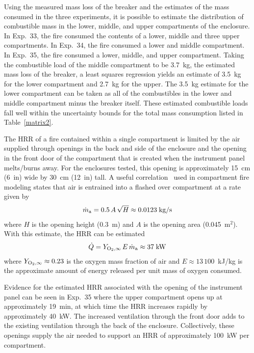 Using the measured mass loss of the breaker and the estimates of the mass consumed in the three experiments, it is possible to estimate the distribution of combustible mass in the lower, middle, and upper compartments of the enclosure. In Exp.~33, the fire consumed the contents of a lower, middle and three upper compartments. In Exp.~34, the fire consumed a lower and middle compartment. In Exp.~35, the fire consumed a lower, middle, and upper compartment. Taking the combustible load of the middle compartment to be 3.7~kg, the estimated mass loss of the breaker, a least squares regression yields an estimate of 3.5~kg for the lower compartment and 2.7~kg for the upper. The 3.5~kg estimate for the lower compartment can be taken as all of the combustibles in the lower and middle compartment minus the breaker itself. These estimated combustible loads fall well within the uncertainty bounds for the total mass consumption listed in Table~\ref{matrix2}.

The HRR of a fire contained within a single compartment is limited by the air supplied through openings in the back and side of the enclosure and the opening in the front door of the compartment that is created when the instrument panel melts/burns away. For the enclosures tested, this opening is approximately 15~cm (6~in) wide by 30~cm (12~in) tall. A useful correlation~\cite{SFPE:Walton} used in compartment fire modeling states that air is entrained into a flashed over compartment at a rate given by
\begin{equation}
   \dot{m}_{\rm a} = 0.5  \, A \, \sqrt{H}  \approx 0.0123 \; \hbox{kg/s}
\end{equation}
where $H$ is the opening height (0.3~m) and $A$ is the opening area (0.045~m$^2$). With this estimate, the HRR can be estimated
\begin{equation}
   \dot{Q} = Y_{\rm O_2,\infty} \, E \, \dot{m}_{\rm a} \approx 37 \; \hbox{kW}
\end{equation}
where $Y_{\rm O_2,\infty}\approx 0.23$ is the oxygen mass fraction of air and $E\approx 13\,100$~kJ/kg is the approximate amount of energy released per unit mass of oxygen consumed.

Evidence for the estimated HRR associated with the opening of the instrument panel can be seen in Exp.~35 where the upper compartment opens up at approximately 19~min, at which time the HRR increases rapidly by approximately 40~kW. The increased ventilation through the front door adds to the existing ventilation through the back of the enclosure. Collectively, these openings supply the air needed to support an HRR of approximately 100~kW per compartment.



